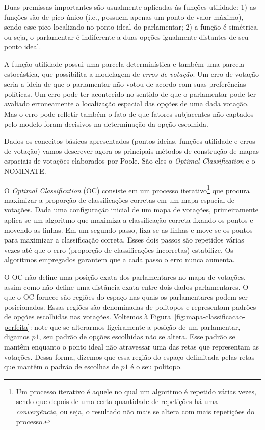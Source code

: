 \documentclass[a4paper, 12pt]{article}
\newcommand\todo[1]{\nb{ToDo}{#1}}
\begin{document}
Duas premissas importantes são usualmente aplicadas às funções utilidade: 1) as funções são de pico único (i.e., possuem apenas um ponto de valor máximo), sendo esse pico localizado no ponto ideal do parlamentar; 2) a função é simétrica, ou seja, o parlamentar é indiferente a duas opções igualmente distantes de seu ponto ideal.

\todo{Fazer figura ilustrativa}

A função utilidade possui uma parcela determinística e também uma parcela estocástica, que possibilita a modelagem de \emph{erros de votação}. Um erro de votação seria a ideia de que o parlamentar não votou de acordo com suas preferências políticas. Um erro pode ter acontecido no sentido de que o parlamentar pode ter avaliado erroneamente a localização espacial das opções de uma dada votação. Mas o erro pode refletir também o fato de que fatores subjacentes não captados pelo modelo foram decisivos na determinação da opção escolhida.

Dados os conceitos básicos apresentados (pontos ideias, funções utilidade e erros de votação) vamos descrever agora os principais métodos de construção de mapas espaciais de votações elaborados por Poole. São eles o \emph{Optimal Classification} e o NOMINATE.

O \emph{Optimal Classification} (OC) consiste em um processo iterativo\footnote{Um processo iterativo é aquele no qual um algoritmo é repetido várias vezes, sendo que depois de uma certa quantidade de repetições há uma \emph{convergência}, ou seja, o resultado não mais se altera com mais repetições do processo.} que procura maximizar a proporção de classificações corretas em um mapa espacial de votações. Dada uma configuração inicial de um mapa de votações, primeiramente aplica-se um algoritmo que maximiza a classificação correta fixando os pontos e movendo as linhas. Em um segundo passo, fixa-se as linhas e move-se os pontos para maximizar a classificação correta. Esses dois passos são repetidos várias vezes até que o erro (proporção de classificações incorretas) estabilize. Os algoritmos empregados garantem que a cada passo o erro nunca aumenta. 

O OC não define uma posição exata dos parlamentares no mapa de votações, assim como não define uma distância exata entre dois dados parlamentares. O que o OC fornece são regiões do espaço nas quais os parlamentares podem ser posicionados. Essas regiões são denominadas de politopos e representam padrões de opções escolhidas nas votações. Voltemos à Figura~\ref{fig:mapa-classificacao-perfeita}: note que se alterarmos ligeiramente a posição de um parlamentar, digamos $p1$, seu padrão de opções escolhidas não se altera. Esse padrão se mantêm enquanto o ponto ideal não atravessar uma das retas que representam as votações. Dessa forma, dizemos que essa região do espaço delimitada pelas retas que mantêm o padrão de escolhas de $p1$ é o seu politopo.
\end{document}
